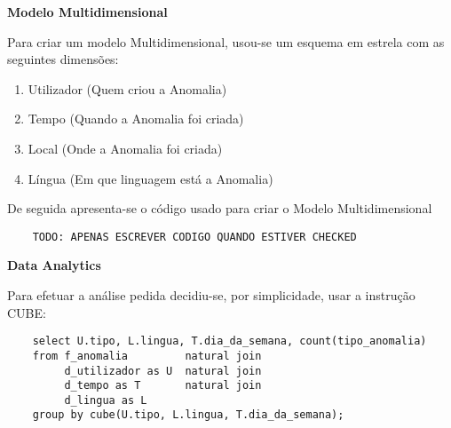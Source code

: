 \documentclass[12pt]{report}
\begin{document}
    
    \Large
    \textbf{Modelo Multidimensional}\\
    \normalsize
    \par Para criar um modelo Multidimensional, usou-se um esquema em estrela com as seguintes  dimensões:
    
    \begin{enumerate}[leftmargin=3\parindent]
        \item Utilizador (Quem criou a Anomalia)
        \item Tempo (Quando a Anomalia foi criada)
        \item Local (Onde a Anomalia foi criada)
        \item Língua (Em que linguagem está a Anomalia)
    \end{enumerate}

    \par De seguida apresenta-se o código usado para criar o Modelo Multidimensional
    \small \begin{verbatim}
    TODO: APENAS ESCREVER CODIGO QUANDO ESTIVER CHECKED
    \end{verbatim}\normalsize
    
    
    \Large
    \textbf{Data Analytics}\\
    \normalsize
    \par Para efetuar a análise pedida decidiu-se, por simplicidade, usar a instrução CUBE:
    \small \begin{verbatim}
    select U.tipo, L.lingua, T.dia_da_semana, count(tipo_anomalia) 
    from f_anomalia         natural join
         d_utilizador as U  natural join
         d_tempo as T       natural join 
         d_lingua as L 
    group by cube(U.tipo, L.lingua, T.dia_da_semana);
    \end{verbatim}\normalsize
\end{document}
